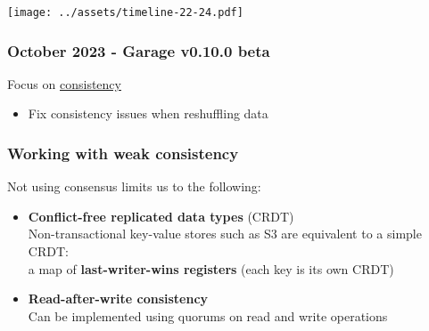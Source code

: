 \documentclass[aspectratio=169]{beamer}
\begin{document}

\begin{frame}
	\begin{center}
		\texttt{[image: ../assets/timeline-22-24.pdf]}
	\end{center}
\end{frame}

\begin{frame}
	\frametitle{October 2023 - Garage v0.10.0 beta}
	Focus on \underline{consistency}
	\vspace{2em}
	\begin{itemize}
		\item Fix consistency issues when reshuffling data
	\end{itemize}
\end{frame}

\begin{frame}
	\frametitle{Working with weak consistency}
	Not using consensus limits us to the following:
	\vspace{2em}
	\begin{itemize}
		\item<2-> \textbf{Conflict-free replicated data types} (CRDT)\\
			\vspace{1em}
			{\footnotesize Non-transactional key-value stores such as S3 are equivalent to a simple CRDT:\\
			a map of \textbf{last-writer-wins registers} (each key is its own CRDT)}
			\vspace{1.5em}
		\item<3-> \textbf{Read-after-write consistency}\\
			\vspace{1em}
			{\footnotesize Can be implemented using quorums on read and write operations}
	\end{itemize}
\end{frame}
\end{document}

